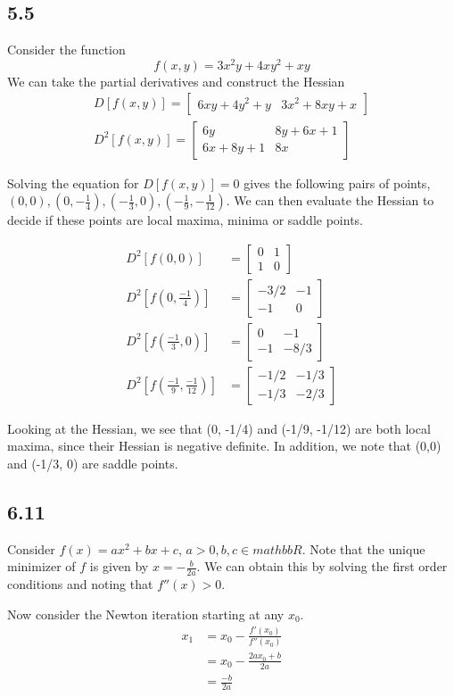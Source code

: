 \documentclass{article}
\begin{document}
	\subsection*{5.5}
	Consider the function 
	\[ f(x,y) = 3x^2y + 4xy^2 + xy \]
	We can take the partial derivatives and construct the Hessian
	\begin{align*}
	D[f(x,y)] = \begin{bmatrix} 6xy + 4y^2 + y & 3x^2 + 8xy + x \end{bmatrix} \\
	D^2[f(x,y)] = \begin{bmatrix} 6y & 8y + 6x + 1 \\ 6x + 8y + 1 & 8x \end{bmatrix}
	\end{align*}
	
	Solving the equation for $D[f(x,y)] = 0$ gives the following pairs of points, $(0,0),(0, -\frac{1}{4}), (-\frac{1}{3}, 0), (-\frac{1}{9}, -\frac{1}{12})$. We can then evaluate the Hessian to decide if these points are local maxima, minima or saddle points.
	
	\begin{align*}
	D^2[f(0,0)] &= \begin{bmatrix} 0 & 1 \\ 1 & 0 \end{bmatrix} \\
	D^2[f(0, \frac{-1}{4})] &= \begin{bmatrix} - 3/2 & - 1 \\ -1 & 0 \end{bmatrix} \\
	D^2[f(\frac{-1}{3}, 0)] &= \begin{bmatrix} 0 & -1 \\ -1 & -8/3 \end{bmatrix} \\
	D^2[f(\frac{-1}{9}, \frac{-1}{12})] &= \begin{bmatrix}  - 1/2 & - 1/3 \\ - 1/3 & -2/3 \end{bmatrix}
	\end{align*}
	
	Looking at the Hessian, we see that (0, -1/4) and (-1/9, -1/12) are both local maxima, since their Hessian is negative definite. In addition, we note that (0,0) and (-1/3, 0) are saddle points.
	
	\subsection*{6.11}
	Consider $f(x) = ax^2 + bx + c$, $a > 0, b, c \in mathbb{R}$. Note that the unique minimizer of $f$ is given by $x = -\frac{b}{2a}$. We can obtain this by solving the first order conditions and noting that $f''(x) > 0$. 
	
	Now consider the Newton iteration starting at any $x_0$.
	\begin{align*}
	x_1 &= x_0 - \frac{f'(x_0)}{f''(x_0)} \\
	&= x_0 - \frac{2a x_0 + b}{2a} \\
	&= \frac{-b}{2a}
	\end{align*}
	
\end{document}
